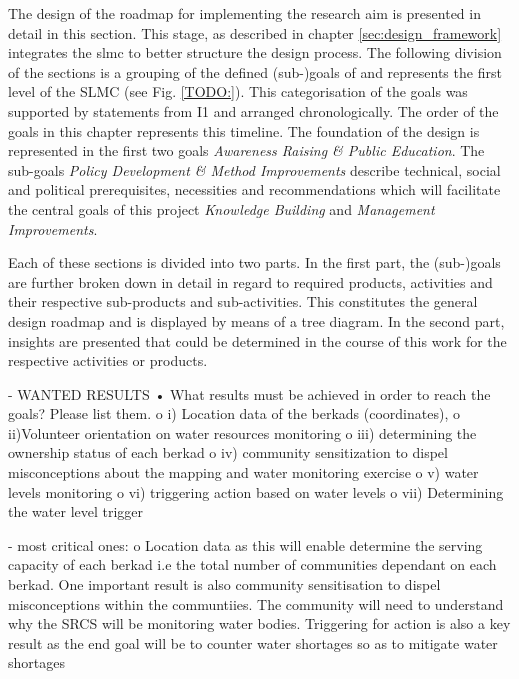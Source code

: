 The design of the roadmap for implementing the research aim is presented in detail in this section. This stage, as described in chapter \ref*{sec:design_framework} integrates the \acrshort{slmc} to better structure the design process. The following division of the sections is a grouping of the defined (sub-)goals of \autocite{minkmanCitizenScienceWater2015} and represents the first level of the SLMC (see Fig. \ref{TODO:}). This categorisation of the goals was supported by statements from I1 and arranged chronologically. The order of the goals in this chapter represents this timeline. The foundation of the design is represented in the first two goals \textit{Awareness Raising \& Public Education}. The sub-goals \textit{Policy Development \& Method Improvements} describe technical, social and political prerequisites, necessities and recommendations which will facilitate the central goals of this project \textit{Knowledge Building} and \textit{Management Improvements}. 


Each of these sections is divided into two parts. In the first part, the (sub-)goals are further broken down in detail in regard to required products, activities and their respective sub-products and sub-activities. This constitutes the general design roadmap and is displayed by means of a tree diagram. In the second part, insights are presented that could be determined in the course of this work for the respective activities or products.




- WANTED RESULTS
•	What results must be achieved in order to reach the goals? Please list them.
o	i) Location data of the berkads (coordinates),
o	ii)Volunteer orientation on water resources monitoring
o	iii) determining the ownership status of each berkad
o	iv) community sensitization to dispel misconceptions about the mapping and water monitoring exercise
o	v) water levels monitoring
o	vi) triggering action based on water levels
o	vii) Determining the water level trigger

- most critical ones:
o	Location data as this will enable determine the serving capacity of each berkad i.e the total number of communities dependant on each berkad. One important result is also community sensitisation to dispel misconceptions within the communtiies. The community will need to understand why the SRCS will be monitoring water bodies. Triggering for action is also a key result as the end goal will be to counter water shortages so as to mitigate water shortages

